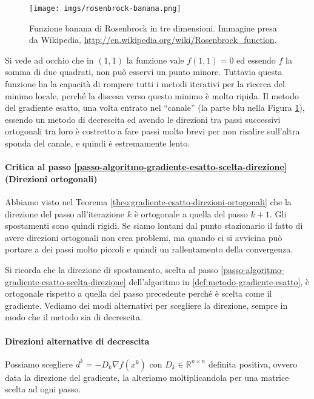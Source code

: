\begin{figure}[h!]   \centering
    \texttt{[image: imgs/rosenbrock-banana.png]}
  \caption{Funzione banana di Rosenbrock in tre dimensioni. Immagine
presa da Wikipedia,
\url{http://en.wikipedia.org/wiki/Rosenbrock_function}.}\label{img:rosenbrock-banana}
\end{figure}


Si vede ad occhio che in $(1,1)$ la funzione vale $f(1,1) = 0$ ed
essendo $f$ la somma di due quadrati, non può esservi un punto
minore. Tuttavia questa funzione ha la capacit\`a di rompere tutti i
metodi iterativi per la ricerca del minimo locale, perch\'e la discesa
verso questo minimo \`e molto ripida. Il metodo del gradiente esatto,
una volta entrato nel ``canale'' (la parte blu nella Figura \ref{img:rosenbrock-banana}), essendo
un metodo di decrescita ed avendo le direzioni tra passi successivi
ortogonali tra loro \`e costretto a fare passi molto brevi per non
risalire sull'altra sponda del canale, e quindi \`e estremamente lento.

\paragraph{Critica al passo
\ref{passo-algoritmo-gradiente-esatto-scelta-direzione} (Direzioni
ortogonali)} Abbiamo visto nel Teorema
\ref{theo:gradiente-esatto-direzioni-ortogonali} che la direzione del
passo all'iterazione $k$ \`e ortogonale a quella del passo $k+1$. Gli
spostamenti sono quindi rigidi. Se siamo lontani dal punto stazionario
il fatto di avere direzioni ortogonali non crea problemi, ma quando ci
si avvicina può portare a dei passi molto piccoli e quindi un
rallentamento della convergenza.

Si ricorda che la direzione di spostamento, scelta al passo
\ref{passo-algoritmo-gradiente-esatto-scelta-direzione} dell'algoritmo
in \ref{def:metodo-gradiente-esatto}, \`e ortogonale rispetto a quella
del passo precedente perch\'e \`e scelta come il gradiente. Vediamo dei
modi alternativi per scegliere la direzione, sempre in modo che il
metodo sia di decrescita.

\paragraph{Direzioni alternative di decrescita}
\label{par:direzioni-alternative-decrescita} Possiamo scegliere $d^{k}
= -D_{k} \nabla f(x^{k})$ con $D_k \in \mathbb{R}^{n\times n}$
definita positiva, ovvero data la direzione del gradiente, la
alteriamo moltiplicandola per una matrice scelta ad ogni passo.

